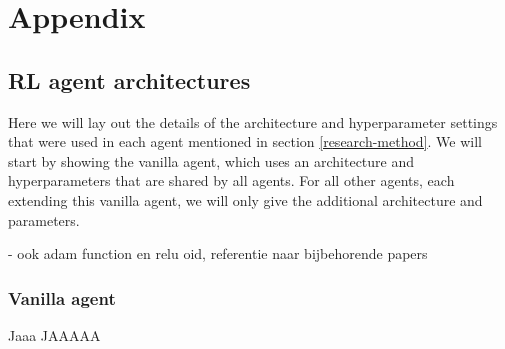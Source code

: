 \chapter{Appendix}\label{appendix}
\section{RL agent architectures}\label{appendix-agents}
Here we will lay out the details of the architecture and hyperparameter settings that were used in each agent mentioned in section \ref{research-method}. We will start by showing the vanilla agent, which uses an architecture and hyperparameters that are shared by all agents. For all other agents, each extending this vanilla agent, we will only give the additional architecture and parameters.

- ook adam function en relu oid, referentie naar bijbehorende papers

\subsection{Vanilla agent}
Jaaa JAAAAA
